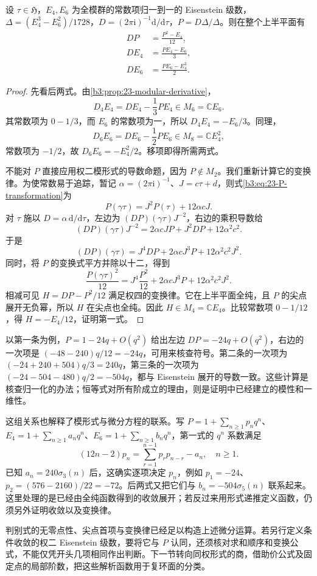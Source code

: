 \begin{theorem}\label{b3:thm:23-ramanujan}
设 \(\tau\in\mathfrak H\)，\(E_4,E_6\) 为全模群的常数项归一到一的 Eisenstein 级数，\(\Delta=(E_4^3-E_6^2)/1728\)，\(D=(2\pi\mathrm{i})^{-1}\mathrm{d}/\mathrm{d}\tau\)，\(P=D\Delta/\Delta\)。则在整个上半平面有
\begin{equation}\label{b3:eq:23-ramanujan}
 \begin{aligned}
 DP&=\frac{P^2-E_4}{12},\\
 DE_4&=\frac{PE_4-E_6}{3},\\
 DE_6&=\frac{PE_6-E_4^2}{2}.
 \end{aligned}
\end{equation}
\end{theorem}
\begin{proof}
先看后两式。由\cref{b3:prop:23-modular-derivative}，
\[
 D_4E_4=DE_4-\frac13PE_4\in M_6=\mathbb CE_6.
\]
其常数项为 \(0-1/3\)，而 \(E_6\) 的常数项为一，所以 \(D_4E_4=-E_6/3\)。同理，
\[
 D_6E_6=DE_6-\frac12PE_6\in M_8=\mathbb CE_4^2,
\]
常数项为 \(-1/2\)，故 \(D_6E_6=-E_4^2/2\)。移项即得所需两式。

不能对 \(P\) 直接应用权二模形式的导数命题，因为 \(P\notin M_2\)。我们重新计算它的变换律。为使常数易于追踪，暂记 \(\alpha=(2\pi\mathrm{i})^{-1}\)、\(J=c\tau+d\)，则式\eqref{b3:eq:23-P-transformation}为
\[
 P(\gamma\tau)=J^2P(\tau)+12\alpha cJ.
\]
对 \(\tau\) 施以 \(D=\alpha\,\mathrm{d}/\mathrm{d}\tau\)，左边为 \((DP)(\gamma\tau)J^{-2}\)，右边的乘积导数给
\[
 (DP)(\gamma\tau)J^{-2}
 =2\alpha cJ P+J^2DP+12\alpha^2c^2.
\]
于是
\[
 (DP)(\gamma\tau)
 =J^4DP+2\alpha cJ^3P+12\alpha^2c^2J^2.
\]
同时，将 \(P\) 的变换式平方并除以十二，得到
\[
 \frac{P(\gamma\tau)^2}{12}
 =J^4\frac{P^2}{12}+2\alpha cJ^3P+12\alpha^2c^2J^2.
\]
相减可见 \(H=DP-P^2/12\) 满足权四的变换律。它在上半平面全纯，且 \(P\) 的尖点展开无负幂，所以 \(H\) 在尖点也全纯。因此 \(H\in M_4=\mathbb CE_4\)。比较常数项 \(0-1/12\)，得 \(H=-E_4/12\)，证明第一式。
\end{proof}

以第一条为例，\(P=1-24q+O(q^2)\) 给出左边 \(DP=-24q+O(q^2)\)，右边的一次项是 \((-48-240)q/12=-24q\)，可用来核查符号。第二条的一次项为 \((-24+240+504)q/3=240q\)，第三条的一次项为 \((-24-504-480)q/2=-504q\)，都与 Eisenstein 展开的导数一致。这些计算是核查归一化的办法；恒等式对所有阶成立的理由，则是证明中已经建立的模性和一维性。

\ProseParagraphBreak

这组关系也解释了模形式与微分方程的联系。写 \(P=1+\sum_{n\ge1}p_nq^n\)、\(E_4=1+\sum_{n\ge1}a_nq^n\)、\(E_6=1+\sum_{n\ge1}b_nq^n\)，第一式的 \(q^n\) 系数满足
\[
 (12n-2)p_n=\sum_{r=1}^{n-1}p_rp_{n-r}-a_n,
 \quad n\ge1.
\]
已知 \(a_n=240\sigma_3(n)\) 后，这确实逐项决定 \(p_n\)，例如 \(p_1=-24\)、\(p_2=(576-2160)/22=-72\)。后两式又把它们与 \(b_n=-504\sigma_5(n)\) 联系起来。这里处理的是已经由全纯函数得到的收敛展开；若反过来用形式递推定义函数，仍须另外证明收敛以及变换律。

\ProseParagraphBreak

判别式的无零点性、尖点首项与变换律已经足以构造上述微分运算。若另行定义条件收敛的权二 Eisenstein 级数，要将它与 \(P\) 认同，还须核对求和顺序和变换公式，不能仅凭开头几项相同作出判断。下一节转向同权形式的商，借助价公式及固定点的局部阶数，把这些解析函数用于复环面的分类。
